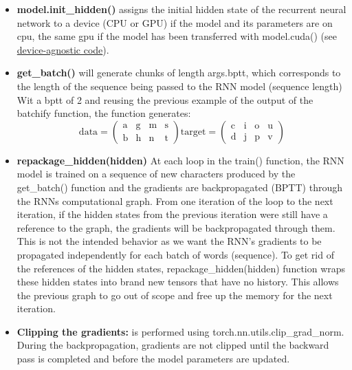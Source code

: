 \documentclass[11pt]{article}
\newcommand{\0}{\mat{0}}
\begin{document}
\begin{itemize}
\begin{itemize}
	\item \textbf{model.init\_hidden()}  assigns the initial hidden state of the recurrent neural network to a device (CPU or GPU)
	if the model and its parameters are on cpu, the same gpu if the model has been transferred with model.cuda()
	(see \href{https://github.com/pytorch/pytorch/blob/master/docs/source/notes/cuda.rst}{device-agnostic code}).
	\item \textbf{get\_batch()} will  generate chunks of length args.bptt, which corresponds to the length of the sequence being passed to the RNN model (sequence length) 
	Wit a bptt of 2 and reusing the previous example of the output of the batchify function, the function generates: 
	\[ \text{data}=\left(  \begin{array}{cccc}
			\text{a} &  \text{g} & \text{m} & \text{s}  \\
			\text{b}  &  \text{h} & \text{n} & \text{t}
		   \end{array} \right)
	 \text{target}=\left(\begin{array}{cccc}
			\text{c}  &  \text{i} & \text{o} & \text{u} \\
			\text{d}  &  \text{j} & \text{p} & \text{v}
		\end{array} \right)
	\]
	\item \textbf{repackage\_hidden(hidden)}  At each loop in the train() function, the RNN model is trained on a sequence of new characters produced by the  get\_batch() function and the gradients are backpropagated (BPTT) through the RNNs computational graph. From one iteration of the loop to the next iteration, if the hidden states from the previous iteration were still have a reference to the graph, the gradients will be backpropagated through them. This is not the intended behavior as we want the RNN's gradients to be propagated independently for each batch of words (sequence). To get rid of the references of the hidden states, repackage\_hidden(hidden) function wraps these hidden states into brand new tensors that have no history. This allows the previous graph to go out of scope and free up the memory for the next iteration.
	\item \textbf{Clipping the gradients:} is performed using  torch.nn.utils.clip\_grad\_norm. During the backpropagation, gradients are not clipped until the backward pass is completed and before the model parameters are updated.
	\end{itemize}
		   
         \begin{center}
         \begin{tikzpicture}[node distance = 2cm, auto]
        

\end{tikzpicture}
\end{center}
\end{itemize}
\end{document}
